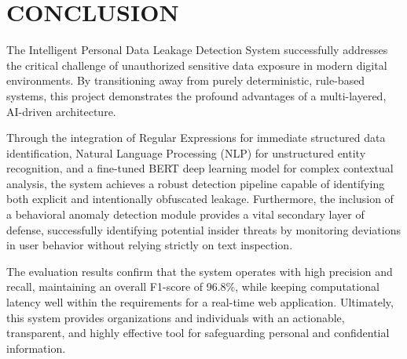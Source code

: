 ﻿\chapter{CONCLUSION}
\thispagestyle{fancy}
\hspace{0.5cm}
The Intelligent Personal Data Leakage Detection System successfully addresses the critical challenge of unauthorized sensitive data exposure in modern digital environments. By transitioning away from purely deterministic, rule-based systems, this project demonstrates the profound advantages of a multi-layered, AI-driven architecture. 

\par Through the integration of Regular Expressions for immediate structured data identification, Natural Language Processing (NLP) for unstructured entity recognition, and a fine-tuned BERT deep learning model for complex contextual analysis, the system achieves a robust detection pipeline capable of identifying both explicit and intentionally obfuscated leakage. Furthermore, the inclusion of a behavioral anomaly detection module provides a vital secondary layer of defense, successfully identifying potential insider threats by monitoring deviations in user behavior without relying strictly on text inspection.

\par The evaluation results confirm that the system operates with high precision and recall, maintaining an overall F1-score of 96.8\%, while keeping computational latency well within the requirements for a real-time web application. Ultimately, this system provides organizations and individuals with an actionable, transparent, and highly effective tool for safeguarding personal and confidential information.
